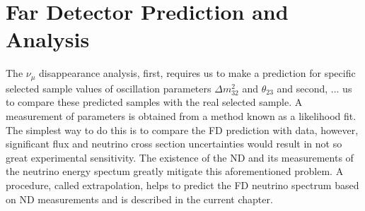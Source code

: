 \chapter{Far Detector Prediction and Analysis}
\label{prediction_chapter}

The $\nu_\mu$ disappearance analysis, first, requires us to make
a prediction for specific selected sample values of oscillation parameters $\Delta m^2_{32}$ and 
$\theta_{23}$ and second, ... us to compare these predicted samples with the real selected sample. A measurement 
of parameters is obtained from a method known as a likelihood fit. The simplest way to do this is to 
compare the FD prediction with data, however, significant flux and neutrino cross section
uncertainties would result in not so great experimental sensitivity. The existence of the ND and its measurements
of the neutrino energy spectum greatly mitigate this aforementioned problem. A procedure, called extrapolation, 
helps to predict the FD neutrino spectrum based on ND measurements and is described in the current chapter.

